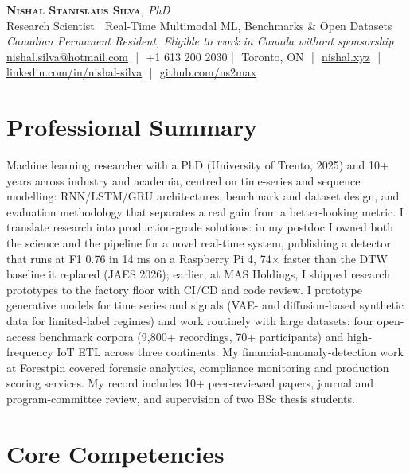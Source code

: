 \documentclass[11pt]{article}
\makeatletter
\newcommand{\cvName}{Nishal Stanislaus Silva}
\newcommand{\cvEmail}{nishal.silva@hotmail.com}
\newcommand{\cvPhone}{+1 613 200 2030}
\newcommand{\cvCity}{Toronto, ON}
\newcommand{\cvSite}{https://nishal.xyz}
\newcommand{\cvLinkedIn}{https://www.linkedin.com/in/nishal-silva}
\newcommand{\cvGitHub}{https://github.com/ns2max}
\newcommand{\cvStatus}{Canadian Permanent Resident, Eligible to work in Canada without sponsorship}
\newcommand{\cvTagline}{Research Scientist | Real-Time Multimodal ML, Benchmarks \& Open Datasets}
\makeatother
\begin{document}
\pagestyle{empty}
\begin{center}
    {\LARGE \scshape \textbf{\cvName}}{\large \textit{, PhD}}\\[1pt]
    {\small \cvTagline}\\[1pt]
    {\footnotesize\textit{\cvStatus}}\\[1pt]
    {\small
    \href{mailto:\cvEmail}{\cvEmail} \,\,|\,\, \cvPhone \,\,|\,\, \cvCity
    \,\,|\,\, \href{\cvSite}{nishal.xyz} \,\,|\,\, \href{\cvLinkedIn}{linkedin.com/in/nishal-silva}
    \,\,|\,\, \href{\cvGitHub}{github.com/ns2max}}
\end{center}

\section*{Professional Summary}

Machine learning researcher with a PhD (University of Trento, 2025) and 10+ years across industry and academia, centred on time-series and sequence modelling: RNN/LSTM/GRU architectures, benchmark and dataset design, and evaluation methodology that separates a real gain from a better-looking metric. I translate research into production-grade solutions: in my postdoc I owned both the science and the pipeline for a novel real-time system, publishing a detector that runs at F1 0.76 in 14 ms on a Raspberry Pi 4, 74$\times$ faster than the DTW baseline it replaced (JAES 2026); earlier, at MAS Holdings, I shipped research prototypes to the factory floor with CI/CD and code review. I prototype generative models for time series and signals (VAE- and diffusion-based synthetic data for limited-label regimes) and work routinely with large datasets: four open-access benchmark corpora (9,800+ recordings, 70+ participants) and high-frequency IoT ETL across three continents. My financial-anomaly-detection work at Forestpin covered forensic analytics, compliance monitoring and production scoring services. My record includes 10+ peer-reviewed papers, journal and program-committee review, and supervision of two BSc thesis students.

\section*{Core Competencies}
\end{document}
